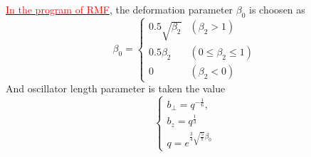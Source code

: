 \underline{\textcolor{red}{In the program of RMF}}, the deformation parameter $\beta_0$ is choosen as
\begin{equation}
\beta_{0}= 
\begin{cases}
  0.5 \sqrt{\beta_{2}} & \left(\beta_{2}>1\right) \\ 
  0.5 \beta_{2}        & \left(0 \leq \beta_{2} \leq 1\right) \\ 
  0                    & \left(\beta_{2}<0\right)
\end{cases}
\end{equation}
And oscillator length parameter is taken the value
\begin{equation}
\begin{cases}
  b_{\perp} = q^{-\frac{1}{6}}, \\
  b_z = q^{\frac{1}{3}}  \\
  q  = e^{\frac{3}{4}\sqrt{\frac{5}{\pi}} \beta_0}
\end{cases}
\end{equation}

